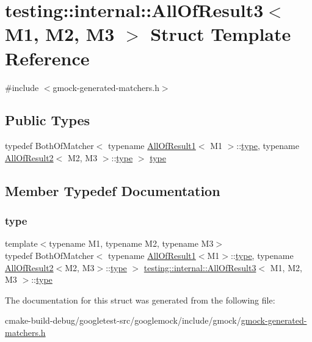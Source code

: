 \hypertarget{structtesting_1_1internal_1_1AllOfResult3}{}\section{testing\+::internal\+::All\+Of\+Result3$<$ M1, M2, M3 $>$ Struct Template Reference}
\label{structtesting_1_1internal_1_1AllOfResult3}


{\ttfamily \#include $<$gmock-\/generated-\/matchers.\+h$>$}

\subsection*{Public Types}
\begin{DoxyCompactItemize}
\item 
typedef Both\+Of\+Matcher$<$ typename \mbox{\hyperlink{structtesting_1_1internal_1_1AllOfResult1}{All\+Of\+Result1}}$<$ M1 $>$\+::\mbox{\hyperlink{structtesting_1_1internal_1_1AllOfResult3_a18073a23acd542bccf3a6c5d7f72f957}{type}}, typename \mbox{\hyperlink{structtesting_1_1internal_1_1AllOfResult2}{All\+Of\+Result2}}$<$ M2, M3 $>$\+::\mbox{\hyperlink{structtesting_1_1internal_1_1AllOfResult3_a18073a23acd542bccf3a6c5d7f72f957}{type}} $>$ \mbox{\hyperlink{structtesting_1_1internal_1_1AllOfResult3_a18073a23acd542bccf3a6c5d7f72f957}{type}}
\end{DoxyCompactItemize}


\subsection{Member Typedef Documentation}
\mbox{\label{structtesting_1_1internal_1_1AllOfResult3_a18073a23acd542bccf3a6c5d7f72f957}} 
\subsubsection{\texorpdfstring{type}{type}}
{\footnotesize\ttfamily template$<$typename M1, typename M2, typename M3$>$ \\
typedef Both\+Of\+Matcher$<$ typename \mbox{\hyperlink{structtesting_1_1internal_1_1AllOfResult1}{All\+Of\+Result1}}$<$M1$>$\+::\mbox{\hyperlink{structtesting_1_1internal_1_1AllOfResult3_a18073a23acd542bccf3a6c5d7f72f957}{type}}, typename \mbox{\hyperlink{structtesting_1_1internal_1_1AllOfResult2}{All\+Of\+Result2}}$<$M2, M3$>$\+::\mbox{\hyperlink{structtesting_1_1internal_1_1AllOfResult3_a18073a23acd542bccf3a6c5d7f72f957}{type}} $>$ \mbox{\hyperlink{structtesting_1_1internal_1_1AllOfResult3}{testing\+::internal\+::\+All\+Of\+Result3}}$<$ M1, M2, M3 $>$\+::\mbox{\hyperlink{structtesting_1_1internal_1_1AllOfResult3_a18073a23acd542bccf3a6c5d7f72f957}{type}}}



The documentation for this struct was generated from the following file\+:\begin{DoxyCompactItemize}
\item 
cmake-\/build-\/debug/googletest-\/src/googlemock/include/gmock/\mbox{\hyperlink{gmock-generated-matchers_8h}{gmock-\/generated-\/matchers.\+h}}\end{DoxyCompactItemize}
